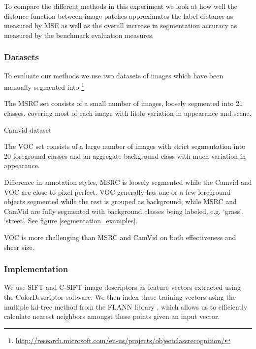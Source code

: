 \documentclass[a4paper,titlepage]{article}
\begin{document}
To compare the different methods in this experiment we look at how well the distance function between image patches approximates the label distance as measured by \ac{MSE} as well as the overall increase in segmentation accuracy as measured by the benchmark evaluation measures.



\subsubsection{Datasets}

To evaluate our methods we use two datasets of images which have been manually segmented into  \footnote{\url{http://research.microsoft.com/en-us/projects/objectclassrecognition/}}

The MSRC set consists of a small number of images, loosely segmented into 21 classes. covering most of each image with little variation in appearance and scene.

Camvid dataset

The VOC set consists of a large number of images with strict segmentation into 20 foreground classes and an aggregate background class with much variation in appearance. %

Difference in annotation styles, MSRC is loosely segmented while the Camvid and VOC are close to pixel-perfect. VOC generally has one or a few foreground objects segmented while the rest is grouped as background, while MSRC and CamVid are fully segmented with background classes being labeled, e.g. `grass', `street'. See figure \ref{segmentation_examples}.

VOC is more challenging than MSRC and CamVid on both effectiveness and sheer size.


\subsubsection{Implementation}

We use SIFT and C-SIFT image descriptors as feature vectors extracted using the ColorDescriptor software. \cite{sande2011empowering} We then index these training vectors using the multiple kd-tree method from the FLANN library \cite{muja2009fast}, which allows us to efficiently calculate nearest neighbors amongst these points given an input vector.
\end{document}
